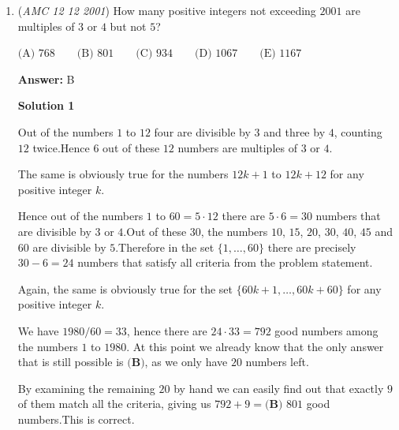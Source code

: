 \begin{enumerate}
\textbf{Solution 4}

First, we figure out the total number of ways to arrange the $5$ chips. There are $\frac{5!}{3!2!} = 10$ ways of arranging them. Now if the last chip is white, all we need to do is to arrange the 4 chips before the last $W$, which are $WWRR$. There are $\frac{4!}{2!2!} = 6$ ways of arranging the first 4 chips. Therefore, the answer is $\frac{6}{10} = \boxed{\textbf{(D) }\dfrac35}$




\textbf{Solution 5}

Test a few possibilities and see that all of the possibilities with white last have probability $\frac{1}{10}$, and there are $6$ possible ways, so it is $\frac{6}{10} = \boxed{\text{(D) }\frac{3}{5}}$.

 


	\item (\textit{AMC 12 12 2001}) How many positive integers not exceeding $2001$ are multiples of $3$ or $4$ but not $5$?


 $\text{(A) }768 \qquad \text{(B) }801 \qquad \text{(C) }934 \qquad \text{(D) }1067 \qquad \text{(E) }1167$

 \textbf{Answer: }B



\textbf{Solution 1}

Out of the numbers $1$ to $12$ four are divisible by $3$ and three by $4$, counting $12$ twice.Hence $6$ out of these $12$ numbers are multiples of $3$ or $4$. 

 The same is obviously true for the numbers $12k+1$ to $12k+12$ for any positive integer $k$.

 Hence out of the numbers $1$ to $60=5\cdot 12$ there are $5\cdot 6=30$ numbers that are divisible by $3$ or $4$.Out of these $30$, the numbers $10$, $15$, $20$, $30$, $40$, $45$ and $60$ are divisible by $5$.Therefore in the set $\{1,\dots,60\}$ there are precisely $30-6=24$ numbers that satisfy all criteria from the problem statement.

 Again, the same is obviously true for the set $\{60k+1,\dots,60k+60\}$ for any positive integer $k$.

 We have $1980/60 = 33$, hence there are $24\cdot 33 = 792$ good numbers among the numbers $1$ to $1980$. At this point we already know that the only answer that is still possible is $\boxed{\textbf{(B)}}$, as we only have $20$ numbers left.

 By examining the remaining $20$ by hand we can easily find out that exactly $9$ of them match all the criteria, giving us $792+9=\boxed{\textbf{(B) }801}$ good numbers.This is correct.


\end{enumerate}
